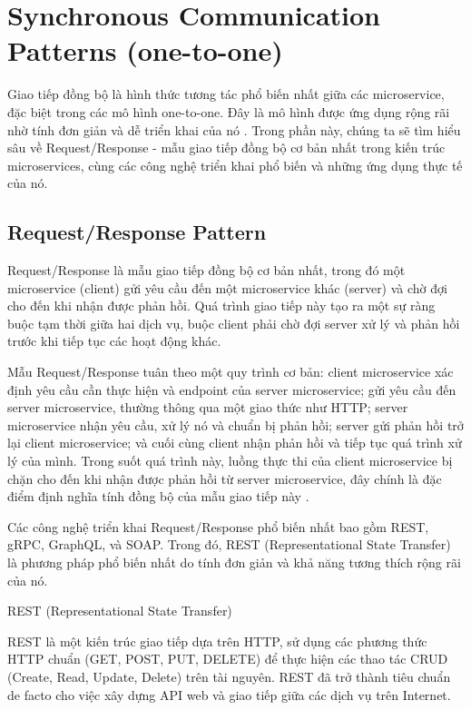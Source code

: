 \section{Synchronous Communication Patterns (one-to-one)}
Giao tiếp đồng bộ là hình thức tương tác phổ biến nhất giữa các microservice, đặc biệt trong các mô hình one-to-one. Đây là mô hình được ứng dụng rộng rãi nhờ tính đơn giản và dễ triển khai của nó \cite{newman2015}. Trong phần này, chúng ta sẽ tìm hiểu sâu về Request/Response - mẫu giao tiếp đồng bộ cơ bản nhất trong kiến trúc microservices, cùng các công nghệ triển khai phổ biến và những ứng dụng thực tế của nó.

\subsection{Request/Response Pattern}
Request/Response là mẫu giao tiếp đồng bộ cơ bản nhất, trong đó một microservice (client) gửi yêu cầu đến một microservice khác (server) và chờ đợi cho đến khi nhận được phản hồi. Quá trình giao tiếp này tạo ra một sự ràng buộc tạm thời giữa hai dịch vụ, buộc client phải chờ đợi server xử lý và phản hồi trước khi tiếp tục các hoạt động khác.

Mẫu Request/Response tuân theo một quy trình cơ bản: client microservice xác định yêu cầu cần thực hiện và endpoint của server microservice; gửi yêu cầu đến server microservice, thường thông qua một giao thức như HTTP; server microservice nhận yêu cầu, xử lý nó và chuẩn bị phản hồi; server gửi phản hồi trở lại client microservice; và cuối cùng client nhận phản hồi và tiếp tục quá trình xử lý của mình. Trong suốt quá trình này, luồng thực thi của client microservice bị chặn cho đến khi nhận được phản hồi từ server microservice, đây chính là đặc điểm định nghĩa tính đồng bộ của mẫu giao tiếp này \cite{newman2015}.

Các công nghệ triển khai Request/Response phổ biến nhất bao gồm REST, gRPC, GraphQL, và SOAP. Trong đó, REST (Representational State Transfer) là phương pháp phổ biến nhất do tính đơn giản và khả năng tương thích rộng rãi của nó.

REST (Representational State Transfer)

REST là một kiến trúc giao tiếp dựa trên HTTP, sử dụng các phương thức HTTP chuẩn (GET, POST, PUT, DELETE) để thực hiện các thao tác CRUD (Create, Read, Update, Delete) trên tài nguyên. REST đã trở thành tiêu chuẩn de facto cho việc xây dựng API web và giao tiếp giữa các dịch vụ trên Internet.

